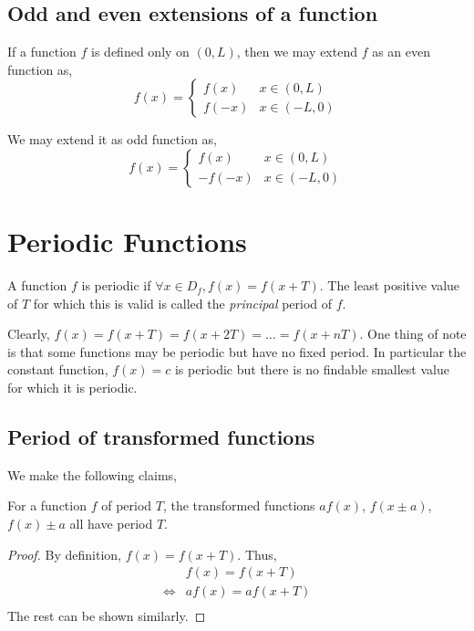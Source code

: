\subsection{Odd and even extensions of a function}

If a function \(f\) is defined only on \(\left( 0, L \right)\), then we may extend \(f\) as an even function as,
\[
    f(x) =
    \begin{cases}
        f(x) & x \in \left( 0, L \right) \\
        f(-x) & x \in \left( -L, 0 \right)
    \end{cases}\]

We may extend it as odd function as,
\[
    f(x) =
    \begin{cases}
        f(x) & x \in \left( 0, L \right) \\
        -f(-x) & x \in \left( -L, 0 \right)
    \end{cases}\]   

\section{Periodic Functions}

A function \(f\) is periodic if \(\forall x \in D_{f}, f(x) = f(x + T)\). The least positive value of \(T\) for
which this is valid is called the \emph{principal} period of \(f\). 

Clearly, \(f(x) = f(x + T) = f(x + 2T) = \dots = f(x + nT)\). One thing of note is that some functions
may be periodic but have no fixed period. In particular the constant function, \(f(x) = c\) is periodic but
there is no findable smallest value for which it is periodic. 

\subsection{Period of transformed functions}

We make the following claims,

\begin{claim}
    For a function \(f\) of period \(T\), the transformed functions \(af(x)\), \(f(x \pm a)\), \(f(x) \pm a\)
    all have period \(T\). 
\end{claim}

\begin{proof}
    By definition, \(f(x) = f(x + T)\). Thus, 
    \begin{align*}
        & f(x) = f(x + T) \\
        \iff & af(x) = af(x + T) \\
    \end{align*}
    The rest can be shown similarly. 
\end{proof}

